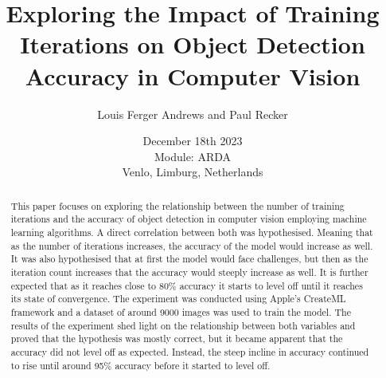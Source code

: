 \documentclass[]{report}
\title{Exploring the Impact of Training Iterations on Object Detection Accuracy in Computer Vision}
\author{Louis Ferger Andrews and Paul Recker}
\date{December 18th 2023 \\Module: ARDA \\Venlo, Limburg, Netherlands}
\begin{document}
\maketitle

\begin{abstract}
This paper focuses on exploring the relationship between the number of training iterations and the accuracy of object detection
in computer vision employing machine learning algorithms. A direct correlation between both was hypothesised. Meaning that as the number
of iterations increases, the accuracy of the model would increase as well. It was also hypothesised that at first the model would face
challenges, but then as the iteration count increases that the accuracy would steeply increase as well. It is further expected that
as it reaches close to 80\% accuracy it starts to level off until it reaches its state of convergence. 
The experiment was conducted using Apple's CreateML framework and a dataset of around 9000 images was used to train the model.
The results of the experiment shed light on the relationship between both variables and proved that the hypothesis was mostly correct, 
but it became apparent that the accuracy did not level off as expected. Instead, the steep incline in accuracy continued to rise until
around 95\% accuracy before it started to level off. 

\end{abstract}

\tableofcontents
\setcounter{page}{3}
\listoffigures %
\listoftables %
\pagebreak
{}	
	
 




\printbibliography[title=References]

\clearpage
\appendix

\end{document}
